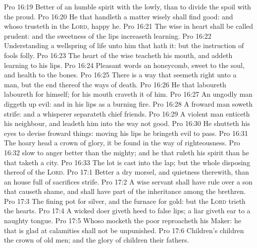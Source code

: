 \vs Pro 16:19 Better  of an humble spirit with the lowly, than to divide the spoil with the proud.
\vs Pro 16:20 He that handleth a matter wisely shall find good: and whoso trusteth in the \textsc{Lord}, happy  he.
\vs Pro 16:21 The wise in heart shall be called prudent: and the sweetness of the lips increaseth learning.
\vs Pro 16:22 Understanding  a wellspring of life unto him that hath it: but the instruction of fools  folly.
\vs Pro 16:23 The heart of the wise teacheth his mouth, and addeth learning to his lips.
\vs Pro 16:24 Pleasant words  an honeycomb, sweet to the soul, and health to the bones.
\vs Pro 16:25 There is a way that seemeth right unto a man, but the end thereof  the ways of death.
\vs Pro 16:26 He that laboureth laboureth for himself; for his mouth craveth it of him.
\vs Pro 16:27 An ungodly man diggeth up evil: and in his lips  as a burning fire.
\vs Pro 16:28 A froward man soweth strife: and a whisperer separateth chief friends.
\vs Pro 16:29 A violent man enticeth his neighbour, and leadeth him into the way  not good.
\vs Pro 16:30 He shutteth his eyes to devise froward things: moving his lips he bringeth evil to pass.
\vs Pro 16:31 The hoary head  a crown of glory,  it be found in the way of righteousness.
\vs Pro 16:32  slow to anger  better than the mighty; and he that ruleth his spirit than he that taketh a city.
\vs Pro 16:33 The lot is cast into the lap; but the whole disposing thereof  of the \textsc{Lord}.
\vs Pro 17:1 Better  a dry morsel, and quietness therewith, than an house full of sacrifices  strife.
\vs Pro 17:2 A wise servant shall have rule over a son that causeth shame, and shall have part of the inheritance among the brethren.
\vs Pro 17:3 The fining pot  for silver, and the furnace for gold: but the \textsc{Lord} trieth the hearts.
\vs Pro 17:4 A wicked doer giveth heed to false lips;  a liar giveth ear to a naughty tongue.
\vs Pro 17:5 Whoso mocketh the poor reproacheth his Maker:  he that is glad at calamities shall not be unpunished.
\vs Pro 17:6 Children's children  the crown of old men; and the glory of children  their fathers.
